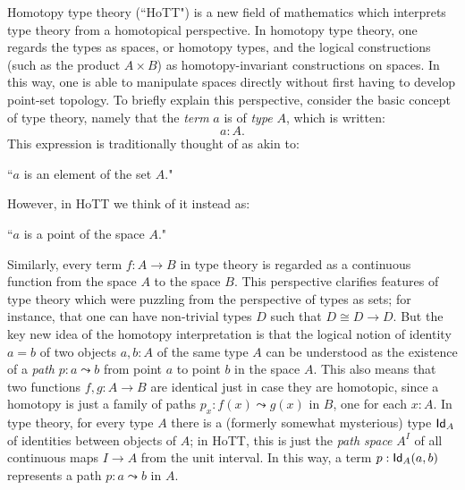 {Homotopy type theory (``HoTT") is a new field of mathematics which interprets type theory from a homotopical perspective.
In homotopy type theory, one regards the types as spaces, or homotopy types, and the logical constructions (such as the product $A\times B$) as homotopy-invariant constructions on spaces.   In this way, one is able to manipulate spaces directly without first having to develop point-set topology.
To briefly explain this perspective, consider the basic concept of type theory, namely that
the \emph{term} $a$ is of \emph{type} $A$, which is written:
$$
  a:A.
$$
This expression is traditionally thought of as akin to:
\begin{center}
``$a$ is an element of the set $A$."
\end{center}
However, in HoTT we think of it instead as:
\begin{center}
``$a$ is a point of the space $A$."
\end{center}
Similarly, every term $f : A\to B$ in type theory is regarded as a continuous function from the space $A$ to the space $B$. This perspective clarifies features of type theory which were puzzling from the perspective of types as sets; for instance, that one can have non-trivial types $D$ such that $D\cong D\to D$.  But the key new idea of the homotopy interpretation is that the logical notion of identity $a = b$ of two objects $a, b: A$ of the same type $A$ can be understood as the existence of a \emph{path} $p : a \leadsto b$ from point $a$ to point $b$ in the space $A$.  This also means that two functions $f, g: A\to B$ are identical just in case they are homotopic, since a homotopy is just a family of paths $p_x: f(x) \leadsto g(x)$ in $B$, one for each $x:A$.  In type theory, for every type $A$ there is a (formerly somewhat mysterious) type ${{\sf Id}}_{A}$ of identities between objects of $A$; in HoTT, this is just the \emph{path space} $A^I$ of all continuous maps $I\to A$ from the unit interval.  In this way, a term $p : {{\sf Id}}_{A}(a,b)$ represents a path $p : a \leadsto b$ in $A$. 

}
